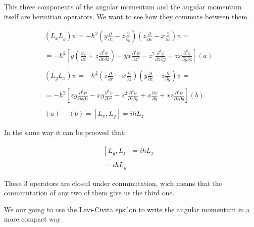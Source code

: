 This three components of the angular momentum and the angular momentum itself are hermitian operators. We want to see how they commute between them.

\begin{equation}
  \begin{array}{c}
  (L_xL_y) \psi = -\hbar^2 (y \frac{\partial}{\partial z} - z \frac{\partial}{\partial y})(z \frac{\partial}{\partial x} - x \frac{\partial}{\partial z}) \psi =
  \\

  \\
  = -\hbar^2 \left[y\left(\frac{\partial \psi}{\partial x}+z\frac{\partial^2\psi}{\partial x \partial z}\right)-yx\frac{\partial^2 \psi}{\partial z^2}-z^2 \frac{\partial^2 \psi}{\partial x \partial y}-zx\frac{\partial^2 \psi}{\partial y \partial z}\right] (a)
  \\

  \\
  (L_y L_x) \psi = -\hbar^2 (z \frac{\partial}{\partial x} - x \frac{\partial}{\partial z})(y \frac{\partial}{\partial z} - z \frac{\partial}{\partial y}) \psi =
  \\

  \\
  = -\hbar^2 \left[zy\frac{\partial^2\psi}{\partial x\partial z}-xy\frac{\partial^2\psi}{\partial z^2}-z^2\frac{\partial^2 \psi}{\partial x \partial y}+x\frac{\partial \psi}{\partial y}+xz\frac{\partial^2 \psi}{\partial z \partial y}\right] (b)
  \\

  \\
  (a)-(b) = [L_x,L_y] =i\hbar L_z
  \end{array}
\end{equation}

In the same way it can be prooved that:

\begin{equation}
  \begin{array}{c}
  [L_y,L_z] =i\hbar L_x
  \\

  \\
  [L_z,L_x] =i\hbar L_y
  \end{array}
\end{equation}

These 3 operators are closed under conmmutation, wich means that the conmmutation of any two of them give us the third one.

We our going to use the Levi-Civita epsilon to write the angular momentum in a more compact way.

